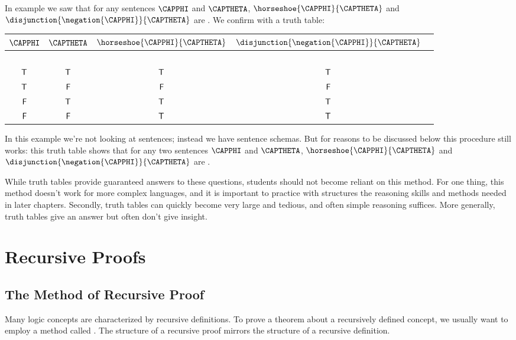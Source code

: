 \begin{majorILnc}{}
In example  we saw that for any \GSL{} sentences $\CAPPHI$ and $\CAPTHETA$, $\horseshoe{\CAPPHI}{\CAPTHETA}$ and $\disjunction{\negation{\CAPPHI}}{\CAPTHETA}$ are . 
We confirm with a truth table:
\begin{center}
\begin{tabular}{ c c c c c }
$\CAPPHI$ & $\CAPTHETA$ & $\horseshoe{\CAPPHI}{\CAPTHETA}$ & $\disjunction{\negation{\CAPPHI}}{\CAPTHETA}$ & \\
\hline
$ $ & $ $ & & & \\[-.25cm]
$\mathsf{T}$ & $\mathsf{T}$ & $\mathsf{T}$ & $\mathsf{T}$ \\
$\mathsf{T}$ & $\mathsf{F}$& $\mathsf{F}$ & $\mathsf{F}$ \\
$\mathsf{F}$ & $\mathsf{T}$ & $\mathsf{T}$ & $\mathsf{T}$\\
$\mathsf{F}$ & $\mathsf{F}$  & $\mathsf{T}$ & $\mathsf{T}$\\
\end{tabular}
\end{center}
In this example we're not looking at \GSL{} sentences; instead we have sentence schemas. 
But for reasons to be discussed below this procedure still works: this truth table shows that for any two sentences $\CAPPHI$ and $\CAPTHETA$, $\horseshoe{\CAPPHI}{\CAPTHETA}$ and $\disjunction{\negation{\CAPPHI}}{\CAPTHETA}$ are .
\end{majorILnc}
While truth tables provide guaranteed answers to these questions, students should not become reliant on this method. 
For one thing, this method doesn't work for more complex languages, and it is important to practice with \GSL{} structures the reasoning skills and methods needed in later chapters. 
Secondly, truth tables can quickly become very large and tedious, and often simple reasoning suffices. 
More generally, truth tables give an answer but often don’t give insight.

\section{Recursive Proofs}\label{Recursive Proofs}

\subsection{The Method of Recursive Proof}
Many logic concepts are characterized by recursive definitions.  
To prove a theorem about a recursively defined concept, we usually want to employ a method called . 
The structure of a recursive proof mirrors the structure of a recursive definition.

